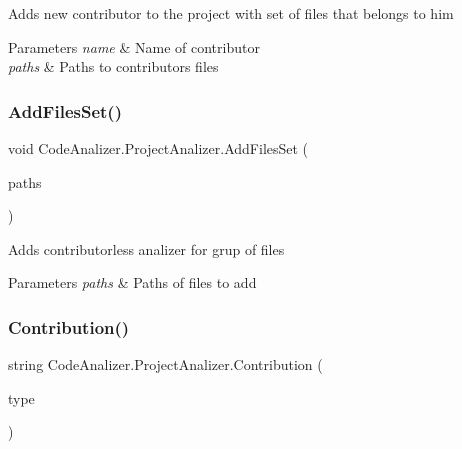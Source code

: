 Adds new contributor to the project with set of files that belongs to him 


\begin{DoxyParams}{Parameters}
{\em name} & Name of contributor\\
\hline
{\em paths} & Paths to contributors files\\
\hline
\end{DoxyParams}
\mbox{\label{class_code_analizer_1_1_project_analizer_a4ed8fe8129186288a99dedd7b4966b2b}} 
\subsubsection{\texorpdfstring{Add\+Files\+Set()}{AddFilesSet()}}
{\footnotesize\ttfamily void Code\+Analizer.\+Project\+Analizer.\+Add\+Files\+Set (\begin{DoxyParamCaption}\item[{string \mbox{[}$\,$\mbox{]}}]{paths }\end{DoxyParamCaption})}



Adds contributorless analizer for grup of files 


\begin{DoxyParams}{Parameters}
{\em paths} & Paths of files to add\\
\hline
\end{DoxyParams}
\mbox{\label{class_code_analizer_1_1_project_analizer_a1403b55c5ff8ed558878246b5ff67ed1}} 
\subsubsection{\texorpdfstring{Contribution()}{Contribution()}}
{\footnotesize\ttfamily string Code\+Analizer.\+Project\+Analizer.\+Contribution (\begin{DoxyParamCaption}\item[{Contribution\+Type}]{type }\end{DoxyParamCaption})}



